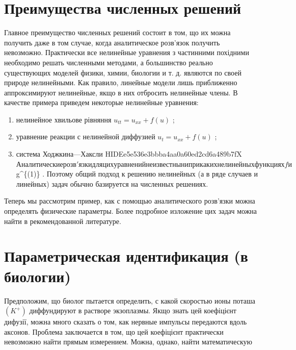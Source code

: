 \documentclass[
  ukrainian,
]{article}
\begin{document}
\section{Преимущества численных
решений}\label{ux43fux440ux435ux438ux43cux443ux449ux435ux441ux442ux432ux430-ux447ux438ux441ux43bux435ux43dux43dux44bux445-ux440ux435ux448ux435ux43dux438ux439}

Главное преимущество численных решений состоит в том, що их можна
получить даже в том случае, когда аналитическое розв'язок получить
невозможно. Практически все нелинейные уравнения з частинними похідними
необходимо решать численными методами, а большинство реально
существующих моделей физики, химии, биологии и т. д. являются по своей
природе нелинейными. Как правило, линейные модели лишь приближенно
аппроксимируют нелинейные, якщо в них отбросить нелинейные члены. В
качестве примера приведем некоторые нелинейные уравнения:

\begin{enumerate}
\def\labelenumi{\arabic{enumi})}
\item
  нелинейное хвильове рівняння \(u_{tt} = u_{xx} + f(u)\) ;
\item
  уравнение реакции с нелинейной диффузией \(u_t = u_{xx} + f(u)\) ;
\item
  система Ходжкина---Хаксли HIDEe5e536e3bbba4aa0a60ed2cd6a489b7fX
  \(Аналитические розв'язки для цих уравнений не известны ни при каких нелинейных функциях f и\)
  g\^{}\{(1)\} . Поэтому общий подход к решению нелинейных (а в ряде
  случаев и линейных) задач обычно базируется на численных решениях.
\end{enumerate}

Теперь мы рассмотрим пример, как с помощью аналитического розв'язки
можна определять физические параметры. Более подробное изложение цих
задач можна найти в рекомендованной литературе.

\section{Параметрическая идентификация (в
биологии)}\label{ux43fux430ux440ux430ux43cux435ux442ux440ux438ux447ux435ux441ux43aux430ux44f-ux438ux434ux435ux43dux442ux438ux444ux438ux43aux430ux446ux438ux44f-ux432-ux431ux438ux43eux43bux43eux433ux438ux438}

Предположим, що биолог пытается определить, с какой скоростью ионы
поташа \((K^+)\) диффундируют в растворе экзоплазмы. Якщо знать цей
коефіцієнт дифузії, можна много сказать о том, как нервные импульсы
передаются вдоль аксонов. Проблема заключается в том, що цей коефіцієнт
практически невозможно найти прямым измерением. Можна, однако, найти
математическую
\end{document}
